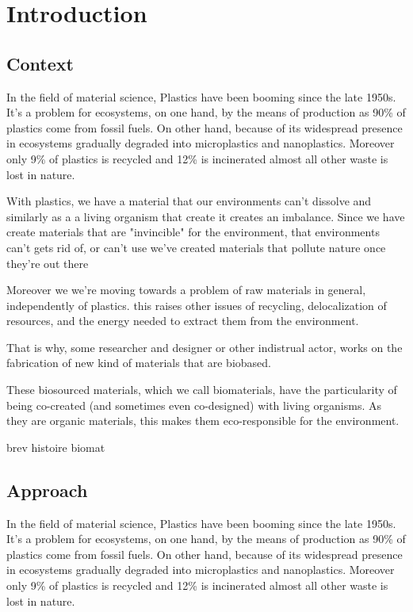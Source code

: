 \justifying
\chapter{Introduction}

\section{Context}

In the field of material science, Plastics have been booming since the late 1950s\cite{geyer2017production}.
It's a problem for ecosystems, on one hand, by the means of production as 90\% of plastics come from fossil fuels. On other hand,
because of its widespread presence in ecosystems gradually degraded into microplastics and nanoplastics.
Moreover only 9\% of plastics is recycled and 12\% is incinerated almost all other waste is lost in nature\cite{natureeditorial}.

With plastics, we have a material that our environments can't dissolve and similarly as a a living organism that create
it creates an imbalance. Since we have create materials that are "invincible" for the environment,  that environments can't gets rid of, or can't use
we've created materials that pollute nature once they're out there

Moreover we we're moving towards a problem of raw materials in general, independently of plastics. this raises other issues of recycling, 
delocalization of resources, and the energy needed to extract them from the environment.

That is why, some researcher and designer or other indistrual actor, works on the fabrication of new kind of materials that are biobased.
 
These biosourced materials, which we call biomaterials, have the particularity of being co-created (and sometimes even co-designed) with living organisms.
As they are organic materials, this makes them eco-responsible for the environment. 

brev histoire biomat 

\section{Approach}

In the field of material science, Plastics have been booming since the late 1950s\cite{geyer2017production}.
It's a problem for ecosystems, on one hand, by the means of production as 90\% of plastics come from fossil fuels. On other hand,
because of its widespread presence in ecosystems gradually degraded into microplastics and nanoplastics.
Moreover only 9\% of plastics is recycled and 12\% is incinerated almost all other waste is lost in nature\cite{natureeditorial}.

